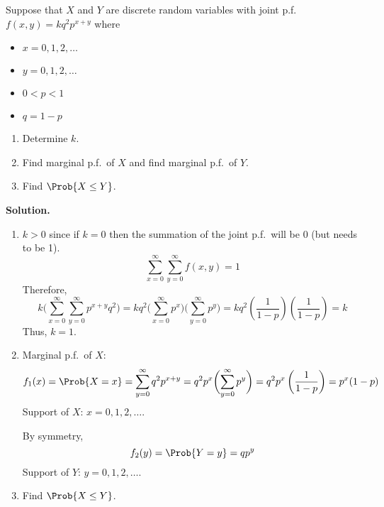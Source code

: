 \begin{Example}{}{}
    Suppose that $ X $ and $ Y $ are discrete random variables
    with joint p.f.\ $ f(x,y)=kq^2 p^{x+y} $ where
    \begin{itemize}
        \item $ x=0,1,2,\ldots $
        \item $ y=0,1,2,\ldots $
        \item $ 0<p<1 $
        \item $ q=1-p $
    \end{itemize}
    \begin{enumerate}[label=(\roman*)]
        \item Determine $ k $.
        \item Find marginal p.f.\ of $ X $ and
              find marginal p.f.\ of $ Y $.
        \item Find $ \Prob{X\le Y} $.
    \end{enumerate}
    \textbf{Solution.}
    \begin{enumerate}[label=(\roman*)]
        \item $ k>0 $ since if $ k=0 $ then the summation
              of the joint p.f.\ will be 0 (but needs to be 1).
              \[\sum\limits_{x=0}^{\infty}
                  \sum\limits_{y=0}^{\infty} f(x,y)=1\]
              Therefore,
              \[k\biggl(\sum\limits_{x=0}^{\infty}
                  \sum\limits_{y=0}^{\infty} p^{x+y}q^2\biggr)=
                  kq^2\biggl(\sum\limits_{x=0}^{\infty} p^x\biggr)
                  \biggl(\sum\limits_{y=0}^{\infty}p^y\biggr)=kq^2
                  \left( \frac{1}{1-p}  \right)\left( \frac{1}{1-p} \right)=k
              \]
              Thus, $ k=1 $.
        \item Marginal p.f.\ of $ X $:
              \[ f_1(x)=\Prob{X=x}=
                  \sum\limits_{y=0}^{\infty} q^2p^{x+y}=
                  q^2 p^x
                  \biggl(\sum\limits_{y=0}^{\infty} p^y \biggr)
                  =q^2 p^x \left( \frac{1}{1-p}  \right)=p^x(1-p) \]
              Support of $ X $: $ x=0,1,2,\ldots $.

              By symmetry,
              \[ f_2(y)=\Prob{Y=y}=qp^y \]
              Support of $ Y $: $ y=0,1,2,\ldots $.
        \item Find $ \Prob{X\le Y} $.


\end{enumerate}
\end{Example}
